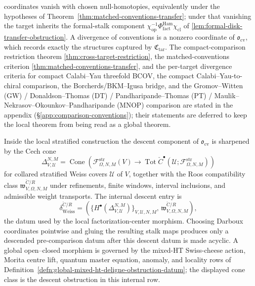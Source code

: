 \documentclass[11pt]{memoir}
\begin{document}
coordinates vanish with chosen null-homotopies, equivalently under the
hypotheses of
Theorem~\ref{thm:matched-conventions-transfer}; under that vanishing the
target inherits the formal-stalk component
\(\chi_{\mathrm{op}}^{-1}\Phi^{\mathrm{Ham}}_{\mathrm{fact}}
\chi_{\mathrm{cl}}\) of
\ref{lem:formal-disk-transfer-obstruction}.  A divergence of
conventions is a nonzero coordinate of
\(\mathfrak o_{\mathrm{cv}}\), which records exactly the structures
captured by \(\mathfrak C_{\mathrm{tar}}\).
The compact-comparison restriction theorem
\ref{thm:cross-target-restriction}, the matched-conventions criterion
\ref{thm:matched-conventions-transfer}, and the per-target divergence
criteria for compact Calabi--Yau threefold BCOV, the compact Calabi--Yau-to-chiral comparison,
the Borcherds/BKM--Igusa bridge, and the
Gromov--Witten (GW) / Donaldson--Thomas (DT) /
Pandharipande--Thomas (PT) / Maulik--Nekrasov--Okounkov--Pandharipande
(MNOP) comparison are stated in the appendix
(\S\ref{app:comparison-conventions}); their statements are deferred to
keep the local theorem from being read as a global theorem.

\begin{rmk}\label{rmk:weiss-ran-descent-obstruction}
  Inside the local stratified construction the descent component of
  \(\mathfrak o_{\mathrm{cv}}\) is sharpened by the Cech cone
  \[
    \Delta^{N,M}_{V,\mathcal U}
    =
    \operatorname{Cone}\!\left(
      \mathcal F^{\mathrm{str}}_{\Omega,N,M}(V)
      \to
      \operatorname{Tot}\check C^\bullet
      (\mathcal U;\mathcal F^{\mathrm{str}}_{\Omega,N,M})
    \right)
  \]
  for collared stratified Weiss covers \(\mathcal U\) of \(V\),
  together with the Roos compatibility class
  \(\mathfrak w^{\check C/R}_{V,\Omega,N,M}\) under refinements, finite
  windows, interval inclusions, and admissible weight transports.  The
  internal descent entry is
  \[
    \delta_{\mathrm{Weiss}}^{\check C/R}
    =
    \left(
      \{H^\bullet(\Delta^{N,M}_{V,\mathcal U})\}_{V,\mathcal U,N,M},\,
      \mathfrak w^{\check C/R}_{V,\Omega,N,M}
    \right),
  \]
  the datum used by the local factorization-center morphism.  Choosing
  Darboux coordinates pointwise and gluing the resulting stalk maps
  produces only a descended pre-comparison datum after this descent
  datum is made acyclic.  A global open--closed morphism is governed by
  the mixed-HT Swiss-cheese action, Morita centre lift, quantum master
  equation, anomaly, and locality rows of
  Definition~\ref{defn:global-mixed-ht-deligne-obstruction-datum}; the
  displayed cone class is the descent obstruction in this internal row.
\end{rmk}
\end{document}

